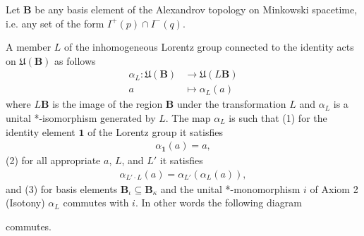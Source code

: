 \begin{definition}
    \label{def:lorentz-covariance}
    \leanok
    Let $\mathbf{B}$ be any basis element of the Alexandrov topology on Minkowski spacetime, i.e. any set of the form $I^+(p) \cap I^-(q)$.

    A member $L$ of the inhomogeneous Lorentz group connected to the identity acts on $\mathfrak{U}(\mathbf{B})$ as follows
    \begin{align}
        \alpha_L : \mathfrak{U}(\mathbf{B}) &\longrightarrow \mathfrak{U}(L\mathbf{B}) \\
                             a              &\longmapsto     \alpha_L(a)
    \end{align}
    where $L\mathbf{B}$ is the image of the region $\mathbf{B}$ under the transformation $L$ and $\alpha_L$ is a unital *-isomorphism generated by $L$. The map $\alpha_L$ is such that (1) for the identity element $\mathbf{1}$ of the Lorentz group it satisfies
    \begin{align}
        \alpha_{\mathbf{1}}(a) = a,
    \end{align}
    (2) for all appropriate $a$, $L$, and $L'$ it satisfies
    \begin{align}
        \alpha_{L' \cdot L}(a) = \alpha_{L'}(\alpha_{L}(a)),
    \end{align}
    and (3) for basis elements $\mathbf{B}_\iota \subseteq \mathbf{B}_\kappa$ and the unital *-monomorphism $i$ of Axiom 2 (Isotony) $\alpha_L$ commutes with $i$. In other words the following diagram

    \begin{center}
    \end{center}

    commutes.
\end{definition}

